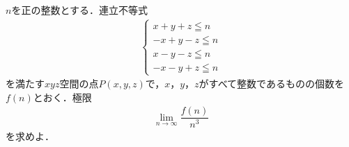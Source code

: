 \documentclass[../../main.tex]{subfiles}
\begin{document}
$n$を正の整数とする．連立不等式
\begin{align*}
  \begin{cases} x+y+z \leqq n \\ -x+y-z \leqq n \\ x-y-z \leqq n \\ -x-y+z \leqq n
  \end{cases}
\end{align*}
を満たす$xyz$空間の点$P(x,y,z)$で，$x$，$y$，$z$がすべて整数であるものの個数を$f(n)$とおく．極限
\begin{align*}
  \lim_{n\to\infty}\dfrac{f(n)}{n^3}
\end{align*}
を求めよ．
\end{document}
